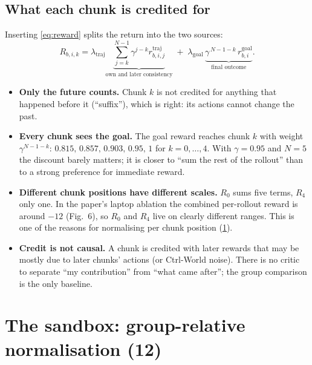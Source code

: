 \documentclass[11pt,a4paper]{article}
\newcommand{\eqp}[1]{\textup{(#1)}} %
\theoremstyle{remark}
\begin{document}
\subsection{What each chunk is credited for}
Inserting \eqref{eq:reward} splits the return into the two sources:
\begin{equation}
R_{b,i,k}=\lambda_{\mathrm{traj}}\underbrace{\sum_{j=k}^{N-1}\gamma^{j-k}r^{\mathrm{traj}}_{b,i,j}}_{\text{own and later consistency}}
\;+\;\lambda_{\mathrm{goal}}\,\underbrace{\gamma^{\,N-1-k}\,r^{\mathrm{goal}}_{b,i}}_{\text{final outcome}} .
\label{eq:split}
\end{equation}
\begin{itemize}
\item \textbf{Only the future counts.} Chunk $k$ is not credited for anything that happened before it (``suffix''), which is right: its actions cannot change the past.
\item \textbf{Every chunk sees the goal.} The goal reward reaches chunk $k$ with weight $\gamma^{N-1-k}$: $0.815,\,0.857,\,0.903,\,0.95,\,1$ for $k=0,\dots,4$. With $\gamma=0.95$ and $N=5$ the discount barely matters; it is closer to ``sum the rest of the rollout'' than to a strong preference for immediate reward.
\item \textbf{Different chunk positions have different scales.} $R_0$ sums five terms, $R_4$ only one. In the paper's laptop ablation the combined per-rollout reward is around $-12$ (Fig.~6), so $R_0$ and $R_4$ live on clearly different ranges. This is one of the reasons for normalising per chunk position (\cref{sec:sandbox}).
\item \textbf{Credit is not causal.} A chunk is credited with later rewards that may be mostly due to later chunks' actions (or Ctrl-World noise). There is no critic to separate ``my contribution'' from ``what came after''; the group comparison is the only baseline.
\end{itemize}

\section{The sandbox: group-relative normalisation \eqp{12}}
\label{sec:sandbox}
\end{document}
